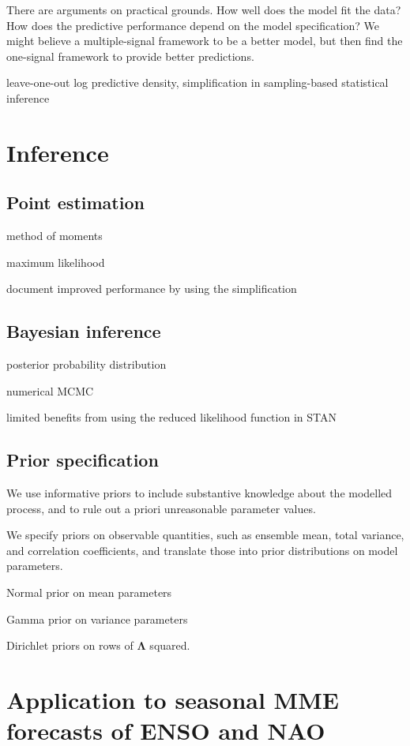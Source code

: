 \documentclass[12pt]{article}
\newcommand{\mat}[1]{\bm{#1}}
\begin{document}
There are arguments on practical grounds. 
How well does the model fit the data? 
How does the predictive performance depend on the model specification?
We might believe a multiple-signal framework to be a better model, but then find the one-signal framework to provide better predictions.


leave-one-out log predictive density, simplification in sampling-based statistical inference 


\section{Inference}


\subsection{Point estimation}

method of moments

maximum likelihood

document improved performance by using the simplification


\subsection{Bayesian inference}

posterior probability distribution

numerical MCMC

limited benefits from using the reduced likelihood function in STAN


\subsection{Prior specification}

We use informative priors to include substantive knowledge about the modelled process, and to rule out a priori unreasonable parameter values.


We specify priors on observable quantities, such as ensemble mean, total variance, and correlation coefficients, and translate those into prior distributions on model parameters.

Normal prior on mean parameters

Gamma prior on variance parameters

Dirichlet priors on rows of $\mat{\Lambda}$ squared.




\section{Application to seasonal MME forecasts of ENSO and NAO}
\end{document}
